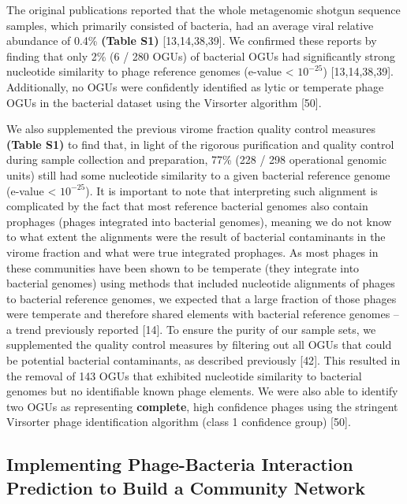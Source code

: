 \documentclass[12pt,]{article}
\begin{document}
The original publications reported that the whole metagenomic shotgun
sequence samples, which primarily consisted of bacteria, had an average
viral relative abundance of 0.4\% \textbf{(Table S1)} {[}13,14,38,39{]}.
We confirmed these reports by finding that only 2\% (6 / 280 OGUs) of
bacterial OGUs had significantly strong nucleotide similarity to phage
reference genomes (e-value \textless{} \(10^{-25}\)) {[}13,14,38,39{]}.
Additionally, no OGUs were confidently identified as lytic or temperate
phage OGUs in the bacterial dataset using the Virsorter algorithm
{[}50{]}.

We also supplemented the previous virome fraction quality control
measures \textbf{(Table S1)} to find that, in light of the rigorous
purification and quality control during sample collection and
preparation, 77\% (228 / 298 operational genomic units) still had some
nucleotide similarity to a given bacterial reference genome (e-value
\textless{} \(10^{-25}\)). It is important to note that interpreting
such alignment is complicated by the fact that most reference bacterial
genomes also contain prophages (phages integrated into bacterial
genomes), meaning we do not know to what extent the alignments were the
result of bacterial contaminants in the virome fraction and what were
true integrated prophages. As most phages in these communities have been
shown to be temperate (they integrate into bacterial genomes) using
methods that included nucleotide alignments of phages to bacterial
reference genomes, we expected that a large fraction of those phages
were temperate and therefore shared elements with bacterial reference
genomes -- a trend previously reported {[}14{]}. To ensure the purity of
our sample sets, we supplemented the quality control measures by
filtering out all OGUs that could be potential bacterial contaminants,
as described previously {[}42{]}. This resulted in the removal of 143
OGUs that exhibited nucleotide similarity to bacterial genomes but no
identifiable known phage elements. We were also able to identify two
OGUs as representing \textbf{complete}, high confidence phages using the
stringent Virsorter phage identification algorithm (class 1 confidence
group) {[}50{]}.

\subsection{Implementing Phage-Bacteria Interaction Prediction to Build
a Community
Network}\label{implementing-phage-bacteria-interaction-prediction-to-build-a-community-network}
\end{document}
